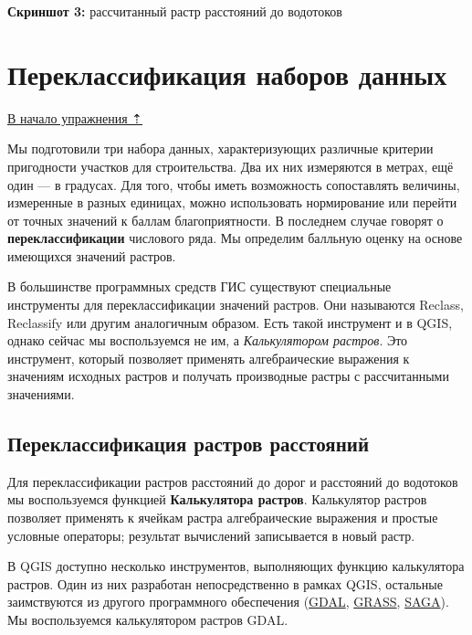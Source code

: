 \documentclass[
  12pt,
]{book}
\begin{document}
\textbf{Скриншот 3:} рассчитанный растр расстояний до водотоков

\hypertarget{weighted-overlay-reclass}{%
\section{Переклассификация наборов данных}\label{weighted-overlay-reclass}}

\protect\hyperlink{weighted-overlay}{В начало упражнения ⇡}

Мы подготовили три набора данных, характеризующих различные критерии пригодности участков для строительства. Два их них измеряются в метрах, ещё один --- в градусах. Для того, чтобы иметь возможность сопоставлять величины, измеренные в разных единицах, можно использовать нормирование или перейти от точных значений к баллам благоприятности. В последнем случае говорят о \textbf{переклассификации} числового ряда. Мы определим балльную оценку на основе имеющихся значений растров.

В большинстве программных средств ГИС существуют специальные инструменты для переклассификации значений растров. Они называются Reclass, Reclassify или другим аналогичным образом. Есть такой инструмент и в QGIS, однако сейчас мы воспользуемся не им, а \emph{Калькулятором растров}. Это инструмент, который позволяет применять алгебраические выражения к значениям исходных растров и получать производные растры с рассчитанными значениями.

\hypertarget{weighted-overlay-reclass-distance}{%
\subsection{Переклассификация растров расстояний}\label{weighted-overlay-reclass-distance}}

Для переклассификации растров расстояний до дорог и расстояний до водотоков мы воспользуемся функцией \textbf{Калькулятора растров}. Калькулятор растров позволяет применять к ячейкам растра алгебраические выражения и простые условные операторы; результат вычислений записывается в новый растр.

В QGIS доступно несколько инструментов, выполняющих функцию калькулятора растров. Один из них разработан непосредственно в рамках QGIS, остальные заимствуются из другого программного обеспечения (\href{https://gdal.org/}{GDAL}, \href{https://grass.osgeo.org/}{GRASS}, \href{http://www.saga-gis.org/en/index.html}{SAGA}). Мы воспользуемся калькулятором растров GDAL.
\end{document}
